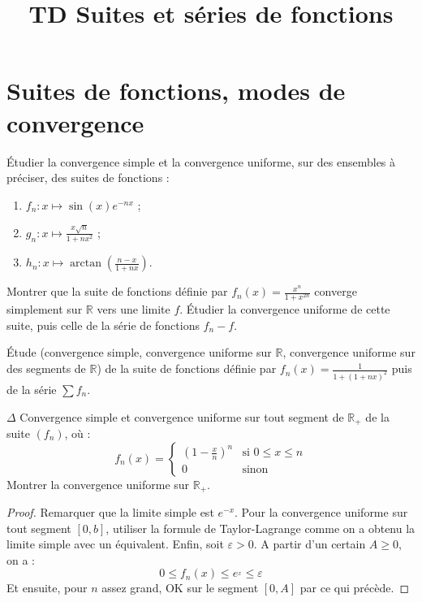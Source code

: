 \documentclass[french,a4paper]{article}
\title{TD Suites et séries de fonctions}
\newcommand{\R}{\mathbb{R}}
\theoremstyle{plain}
\theoremstyle{definition}
\theoremstyle{remark}
\begin{document}
\maketitle

\section{Suites de fonctions, modes de convergence}

\begin{ex}{}
	Étudier la convergence simple et la convergence uniforme, sur des ensembles à préciser, des suites de fonctions : 
	\begin{enumerate}
		\item $f_n:x\mapsto\sin(x)e^{-nx}$ ;
		\item $g_n:x\mapsto\displaystyle\frac{x\sqrt{n}}{1+nx^2}$ ;
		\item $h_n:x\mapsto\arctan\displaystyle\left(\frac{n-x}{1+nx}\right)$.
	\end{enumerate}
\end{ex}

\begin{ex}{}
	Montrer que la suite de fonctions définie par $\displaystyle f_n(x)=\frac{x^n}{1+x^{2n}}$ converge simplement sur $\R$ vers une limite $f$. Étudier la convergence uniforme de cette suite, puis celle de la série de fonctions $f_n-f$.
\end{ex}

\begin{ex}{}
	Étude (convergence simple, convergence uniforme sur $\R$, convergence uniforme sur des segments de $\R$) de la suite de fonctions définie par $f_n(x)=\displaystyle\frac{1}{1+(1+nx)^2}$ puis de la série $\sum f_n$.
\end{ex}

\begin{ex}{$\Delta$}
	Convergence simple et convergence uniforme sur tout segment de $\R_+$ de la suite $(f_n)$, où : $$f_n(x)=\begin{cases}
		\displaystyle\left(1-\frac{x}{n}\right)^n&\text{si }0\leqslant x\leqslant n \\ 0&\text{sinon}
	\end{cases}$$ Montrer la convergence uniforme sur $\R_+$.
\end{ex}
\begin{proof}
	Remarquer que la limite simple est $e^{-x}$. Pour la convergence uniforme sur tout segment $[0,b]$, utiliser la formule de Taylor-Lagrange comme on a obtenu la limite simple avec un équivalent. Enfin, soit $\varepsilon>0$. A partir d'un certain $A\geqslant 0$, on a : $$0\leqslant f_n(x)\leqslant e^{_x}\leqslant \varepsilon$$ Et ensuite, pour $n$ assez grand, OK sur le segment $[0,A]$ par ce qui précède.
\end{proof}
\end{document}
